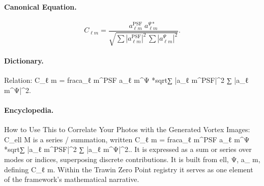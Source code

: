 \paragraph{Canonical Equation.}
\[
C_{\ell m} = \frac{a_{\ell m}^{\text{PSF}} \; a_{\ell m}^{\Psi *}}{\sqrt{\sum |a_{\ell m}^{\text{PSF}}|^2\,\sum |a_{\ell m}^{\Psi}|^2}}.
\]

\paragraph{Dictionary.}
Relation: C\_ℓ m = fraca\_ℓ m\textasciicircum{}PSF a\_ℓ m\textasciicircum{}Ψ *sqrt∑ |a\_ℓ m\textasciicircum{}PSF|\textasciicircum{}2 ∑ |a\_ℓ m\textasciicircum{}Ψ|\textasciicircum{}2.

\paragraph{Encyclopedia.}
How to Use This to Correlate Your Photos with the Generated Vortex Images: C\_ell M is a series / summation, written C\_ℓ m = fraca\_ℓ m\textasciicircum{}PSF a\_ℓ m\textasciicircum{}Ψ *sqrt∑ |a\_ℓ m\textasciicircum{}PSF|\textasciicircum{}2 ∑ |a\_ℓ m\textasciicircum{}Ψ|\textasciicircum{}2.. It is expressed as a sum or series over modes or indices, superposing discrete contributions. It is built from ell, Ψ, a\_ m, defining C\_ℓ m. Within the Trawin Zero Point registry it serves as one element of the framework's mathematical narrative.
